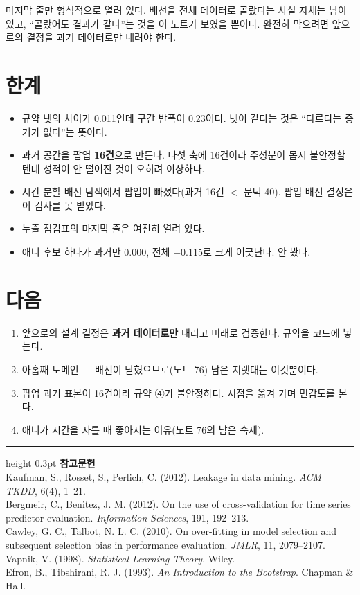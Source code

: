 \documentclass[10pt]{article}
\begin{document}
마지막 줄만 형식적으로 열려 있다. 배선을 전체 데이터로 골랐다는 사실 자체는
남아 있고, ``골랐어도 결과가 같다''는 것을 이 노트가 보였을 뿐이다. 완전히
막으려면 앞으로의 결정을 과거 데이터로만 내려야 한다.

\section{한계}

\begin{itemize}[leftmargin=1.1em,itemsep=0.15em]
\item 규약 넷의 차이가 0.011인데 구간 반폭이 0.23이다. 넷이 같다는 것은
      ``다르다는 증거가 없다''는 뜻이다.
\item 과거 공간을 팝업 \textbf{16건}으로 만든다. 다섯 축에 16건이라 주성분이
      몹시 불안정할 텐데 성적이 안 떨어진 것이 오히려 이상하다.
\item 시간 분할 배선 탐색에서 팝업이 빠졌다(과거 16건 $<$ 문턱 40).
      팝업 배선 결정은 이 검사를 못 받았다.
\item 누출 점검표의 마지막 줄은 여전히 열려 있다.
\item 애니 후보 하나가 과거만 0.000, 전체 $-$0.115로 크게 어긋난다. 안 봤다.
\end{itemize}

\section{다음}

\begin{enumerate}[leftmargin=1.3em,itemsep=0.15em]
\item 앞으로의 설계 결정은 \textbf{과거 데이터로만} 내리고 미래로 검증한다.
      규약을 코드에 넣는다.
\item 아홉째 도메인 --- 배선이 닫혔으므로(노트 76) 남은 지렛대는 이것뿐이다.
\item 팝업 과거 표본이 16건이라 규약 ④가 불안정하다. 시점을 옮겨 가며
      민감도를 본다.
\item 애니가 시간을 자를 때 좋아지는 이유(노트 76의 남은 숙제).
\end{enumerate}

\vspace{0.6em}
\hrule height 0.3pt
\vspace{0.5em}
{\footnotesize
\textbf{참고문헌}\\[0.3em]
Kaufman, S., Rosset, S., Perlich, C. (2012). Leakage in data mining.
\emph{ACM TKDD}, 6(4), 1--21.\\[0.15em]
Bergmeir, C., Benitez, J. M. (2012). On the use of cross-validation for time
series predictor evaluation. \emph{Information Sciences}, 191, 192--213.\\[0.15em]
Cawley, G. C., Talbot, N. L. C. (2010). On over-fitting in model selection and
subsequent selection bias in performance evaluation. \emph{JMLR}, 11, 2079--2107.\\[0.15em]
Vapnik, V. (1998). \emph{Statistical Learning Theory}. Wiley.\\[0.15em]
Efron, B., Tibshirani, R. J. (1993). \emph{An Introduction to the Bootstrap}.
Chapman \& Hall.
}
\end{document}
